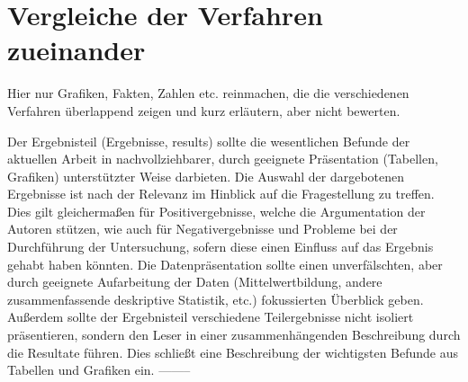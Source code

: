 \section{Vergleiche der Verfahren zueinander}
Hier nur Grafiken, Fakten, Zahlen etc. reinmachen, die die verschiedenen Verfahren überlappend zeigen und kurz erläutern, aber nicht bewerten.

\vspace{5cm}
Der Ergebnisteil (Ergebnisse, results) sollte die wesentlichen Befunde der aktuellen Arbeit in
nachvollziehbarer, durch geeignete Präsentation (Tabellen, Grafiken) unterstützter Weise darbieten.
Die Auswahl der dargebotenen Ergebnisse ist nach der Relevanz im Hinblick auf die
Fragestellung zu treffen. Dies gilt gleichermaßen für Positivergebnisse, welche die Argumentation
der Autoren stützen, wie auch für Negativergebnisse und Probleme bei der Durchführung
der Untersuchung, sofern diese einen Einfluss auf das Ergebnis gehabt haben könnten. Die
Datenpräsentation sollte einen unverfälschten, aber durch geeignete Aufarbeitung der Daten
(Mittelwertbildung, andere zusammenfassende deskriptive Statistik, etc.) fokussierten Überblick
geben. Außerdem sollte der Ergebnisteil verschiedene Teilergebnisse nicht isoliert präsentieren,
sondern den Leser in einer zusammenhängenden Beschreibung durch die Resultate führen.
Dies schließt eine Beschreibung der wichtigsten Befunde aus Tabellen und Grafiken ein.
--------